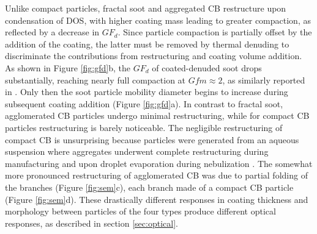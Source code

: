 Unlike compact particles, fractal soot and aggregated CB restructure upon condensation of DOS, with higher coating mass leading to greater compaction, as reflected by a decrease in $GF_d$. Since particle compaction is partially offset by the addition of the coating, the latter must be removed by thermal denuding to discriminate the contributions from restructuring and coating volume addition. As shown in Figure \ref{fig:gfd}b, the $GF_d$ of coated-denuded soot drops substantially, reaching nearly full compaction at $Gfm \approx 2$, as similarly reported in \citep{RN13}. Only then the soot particle mobility diameter begins to increase during subsequent coating addition (Figure \ref{fig:gfd}a). In contrast to fractal soot, agglomerated CB particles undergo minimal restructuring, while for compact CB particles restructuring is barely noticeable. The negligible restructuring of compact CB is unsurprising because particles were generated from an aqueous suspension where aggregates underwent complete restructuring during manufacturing and upon droplet evaporation during nebulization \citep{RN51}. The somewhat more pronounced restructuring of agglomerated CB was due to partial folding of the branches (Figure \ref{fig:sem}c), each branch made of a compact CB particle (Figure \ref{fig:sem}d). These drastically different responses in coating thickness and morphology between particles of the four types produce different optical responses, as described in section \ref{sec:optical}.
